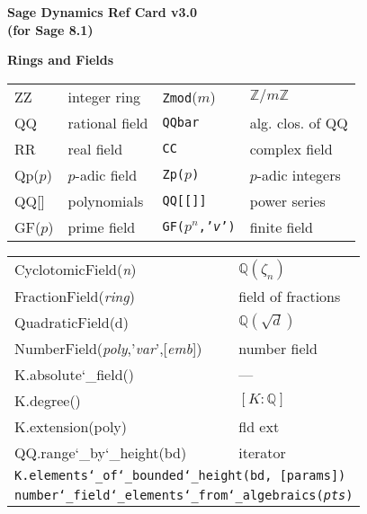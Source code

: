 \documentclass{amsart}
\newcommand{\Section}[1]{\filbreak\par\vspace{5pt}\noindent\textbf{#1}\par\noindent\ignorespaces}
\newcommand{\us}{\char`\_}  %
\def\ver{3.0}
\def\sagever{8.1}
\begin{document}
\begin{multicols}{3}
\Section{\LARGE{Sage Dynamics Ref Card v\ver}\\
\normalsize{(for Sage \sagever})}


\Section{Rings and Fields}
\noindent
\begin{tabular}{@{\ttfamily\enspace}llll}
ZZ & integer ring & \texttt{Zmod}($m$) & $\mathbb{Z}/m\mathbb{Z}$ \\
QQ & rational field  & \texttt{QQbar} & alg. clos. of QQ \\
RR & real field & \texttt{CC} & complex field \\
Qp($p$) & $p$-adic field & \texttt{Zp($p$)} & $p$-adic integers\\
QQ[] & polynomials & \texttt{QQ[[]]} & power series\\
GF($p$) & prime field & \texttt{GF($p^n$,'\textit{v}')}& finite field\\
\end{tabular}
\begin{tabular}{@{\ttfamily\enspace}ll}
CyclotomicField(\textit{n}) & $\mathbb{Q}(\zeta_n)$\\
FractionField(\textit{ring}) & field of fractions\\
QuadraticField(d) & $\mathbb{Q}(\sqrt{d})$\\
NumberField(\textit{poly},'\textit{var}',[\textit{emb}]) & number field\\
K.absolute\us field() & ---\\
K.degree() & $[K : \mathbb{Q}]$\\
K.extension(poly) & fld ext\\
QQ.range\us by\us height(bd) & iterator\\
\multicolumn{2}{l}{\texttt{K.elements\us of\us bounded\us height(bd, [params])}}\\
\multicolumn{2}{l}{\texttt{number\us field\us elements\us from\us algebraics(\textit{pts})}}
\end{tabular}


\end{multicols}
\end{document}
